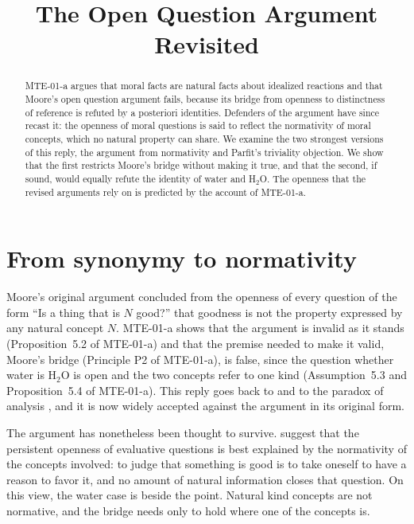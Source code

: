 \documentclass{situationist-preprint}
\title{The Open Question Argument Revisited}
\begin{document}
\maketitle

\begin{abstract}
MTE-01-a argues that moral facts are natural facts about idealized reactions and that Moore's open question argument fails, because its bridge from openness to distinctness of reference is refuted by a posteriori identities. Defenders of the argument have since recast it: the openness of moral questions is said to reflect the normativity of moral concepts, which no natural property can share. We examine the two strongest versions of this reply, the argument from normativity and Parfit's triviality objection. We show that the first restricts Moore's bridge without making it true, and that the second, if sound, would equally refute the identity of water and H$_2$O. The openness that the revised arguments rely on is predicted by the account of MTE-01-a.
\end{abstract}

\section{From synonymy to normativity}\label{s:norm}

Moore's original argument \citep[\S13]{Moore1903} concluded from the openness of every question of the form \enquote{Is a thing that is $N$ good?} that goodness is not the property expressed by any natural concept $N$. MTE-01-a shows that the argument is invalid as it stands (Proposition~5.2 of MTE-01-a) and that the premise needed to make it valid, Moore's bridge (Principle P2 of MTE-01-a), is false, since the question whether water is H$_2$O is open and the two concepts refer to one kind (Assumption~5.3 and Proposition~5.4 of MTE-01-a). This reply goes back to \citet{Frankena1939} and to the paradox of analysis \citep{Langford1942}, and it is now widely accepted against the argument in its original form.

The argument has nonetheless been thought to survive. \citet{DGR1992} suggest that the persistent openness of evaluative questions is best explained by the normativity of the concepts involved: to judge that something is good is to take oneself to have a reason to favor it, and no amount of natural information closes that question. On this view, the water case is beside the point. Natural kind concepts are not normative, and the bridge needs only to hold where one of the concepts is.
\end{document}
